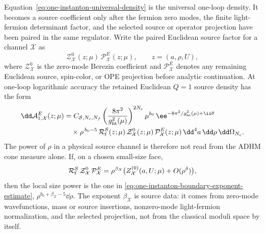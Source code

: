 \begin{controlledapproximation}
\label{ca:one-instanton-source-density-assembly}
Equation~\eqref{eq:one-instanton-universal-density} is the universal
one-loop density.  It becomes a source coefficient only after the
fermion zero modes, the finite light-fermion determinant factor, and the
selected source or operator projection have been paired in the same regulator.
Write the paired Euclidean source factor for a channel \(\mathcal X\) as
\[
  \mathcal Z_{\mathcal X}^{0}(z;\mu)\,
  \mathcal P_{\mathcal X}^{E}(z;\mu),
  \qquad z=(a,\rho,U),
\]
where \(\mathcal Z_{\mathcal X}^{0}\) is the zero-mode Berezin coefficient and
\(\mathcal P_{\mathcal X}^{E}\) denotes any remaining Euclidean source,
spin-color, or OPE projection before analytic continuation.  At one-loop
logarithmic accuracy the retained Euclidean \(Q=1\) source density has the
form
\begin{equation}
  \begin{aligned}
  \dd\mathcal A_{1,\mathcal X}^{E}(z;\mu)
  &=
  C_{\mathcal S,N_c,N_f}
  \left(\frac{8\pi^2}{g_{\rm ht}^2(\mu)}\right)^{2N_c}
  \mu^{b_0}\,
  \ee^{-8\pi^2/g_{\rm ht}^2(\mu)+\ii\theta}        \\
  &\quad\times
  \rho^{\,b_0-5}\,
  \mathcal R_{\rm f}^{\mathcal S}(z;\mu)\,
  \mathcal Z_{\mathcal X}^{0}(z;\mu)\,
  \mathcal P_{\mathcal X}^{E}(z;\mu)\,
  \dd^4a\,\dd\rho\,\dd\Omega_{N_c}.
  \end{aligned}
  \label{eq:one-instanton-source-density-assembly}
\end{equation}
The power of \(\rho\) in a physical source channel is therefore not read from
the ADHM cone measure alone.  If, on a chosen small-size face,
\[
  \mathcal R_{\rm f}^{\mathcal S}\,
  \mathcal Z_{\mathcal X}^{0}\,
  \mathcal P_{\mathcal X}^{E}
  =
  \rho^{\beta_{\mathcal X}}
  \bigl(Z_{\mathcal X}^{(0)}(a,U;\mu)+O(\rho^\delta)\bigr),
\]
then the local size power is the one in
\eqref{eq:one-instanton-boundary-exponent-estimate},
\(\rho^{b_0+\beta_{\mathcal X}-5}\dd\rho\).  The exponent
\(\beta_{\mathcal X}\) is source data: it comes from zero-mode wavefunctions,
mass or source insertions, nonzero-mode light-fermion normalization, and the
selected projection, not from the classical moduli space by itself.


\end{controlledapproximation}
